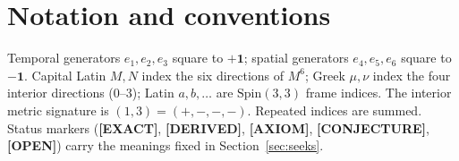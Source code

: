 \documentclass[11pt,oneside]{book}
\newcommand{\Spin}{\mathrm{Spin}}
\newcommand{\status}[1]{{\sffamily\bfseries\color{statuscol}[#1]}}
\theoremstyle{plain}
\theoremstyle{definition}
\theoremstyle{remark}
\begin{document}
\tableofcontents

\chapter*{Notation and conventions}

Temporal generators $e_1,e_2,e_3$ square to $+\mathbf 1$; spatial generators
$e_4,e_5,e_6$ square to $-\mathbf 1$. Capital Latin $M,N$ index the six directions
of $M^6$; Greek $\mu,\nu$ index the four interior directions ($0$--$3$); Latin
$a,b,\dots$ are $\Spin(3,3)$ frame indices. The interior metric signature is
$(1,3)=(+,-,-,-)$. Repeated indices are summed. Status markers
(\status{EXACT}, \status{DERIVED}, \status{AXIOM}, \status{CONJECTURE},
\status{OPEN}) carry the meanings fixed in Section~\ref{sec:seeks}.
\end{document}
